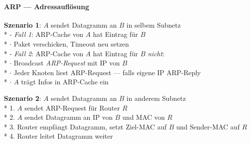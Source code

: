 \paragraph{ARP --- Adressauflösung}
\begin{items}
  \item \textbf{Szenario 1}: \( A \) sendet Datagramm an \( B \) in selbem Subnetz \\*
    - \emph{Fall 1}: ARP-Cache von \( A \) hat Eintrag für \( B \) \\*
      \phantom{-} \( \cdot \) Paket verschicken, Timeout neu setzen \\*
    - \emph{Fall 2}: ARP-Cache von \( A \) hat Eintrag für \( B \) \emph{nicht}: \\*
      \phantom{-} \( \cdot \) Broadcast \emph{ARP-Request} mit IP von \( B \) \\*
      \phantom{-} \( \cdot \) Jeder Knoten liest ARP-Request --- falls eigene IP ARP-Reply \\*
      \phantom{-} \( \cdot \) \( A \) trägt Infos in ARP-Cache ein
  \item \textbf{Szenario 2}: \( A \) sendet Datagramm an \( B \) in anderem Subnetz \\*
    1. \( A \) sendet ARP-Request für Router \( R \) \\*
    2. \( A \) sendet Datagramm an IP von \( B \) und MAC von \( R \) \\*
    3. Router empfängt Datagramm, setzt Ziel-MAC auf \( B \) und Sender-MAC auf \( R \) \\*
    4. Router leitet Datagramm weiter
\end{items}

